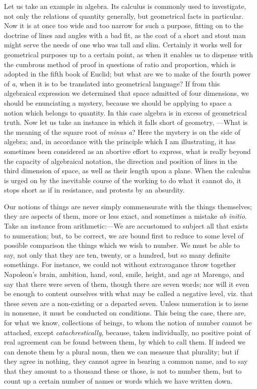 Let us take an example in algebra. Its calculus is commonly used to
investigate, not only the relations of quantity generally, but
geometrical facts in particular. Now it is at once too wide and too
narrow for such a purpose, fitting on to the doctrine of lines and
angles with a bad fit, as the coat of a short and stout man might
serve the needs of one who was tall and slim. Certainly it works well
for geometrical purposes up to a certain point, as when it enables us
to dispense with the cumbrous method of proof in questions of ratio
and proportion, which is adopted in the fifth book of Euclid; but what
are we to make of the fourth power of \emph{a}, when it is to be
translated into geometrical language? If from this algebraical
expression we determined that space admitted of four dimensions, we
should be enunciating a mystery, because we should be applying to
space a notion which belongs to quantity. In this case algebra is in
excess of geometrical truth. Now let us take an instance in which it
falls short of geometry, —What is the meaning of the square root
of \emph{minus a}? Here the mystery is on the side of algebra; and, in
accordance with the principle which I am illustrating, it has
sometimes been considered as an abortive effort to express, what is
really beyond the capacity of algebraical notation, the direction and
position of lines in the third dimension of space, as well as their
length upon a plane. When the calculus is urged on by the inevitable
course of the working to do what it cannot do, it stops short as if in
resistance, and protests by an absurdity.

Our notions of things are never simply commensurate with the things
themselves; they are aspects of them, more or less exact, and
sometimes a mistake \emph{ab initio}. Take an instance from
arithmetic:—We are accustomed to subject all that exists to
numeration; but, to be correct, we are bound first to reduce to some
level of possible comparison the things which we wish to number. We
must be able to say, not only that they are ten, twenty, or a hundred,
but so many definite somethings. For instance, we could not without
extravagance throw together Napoleon's brain, ambition, hand, soul,
smile, height, and age at Marengo, and say that there were seven of
them, though there are seven words; nor will it even be enough to
content ourselves with what may be called a negative level, viz. that
these seven are a non-existing or a departed seven. Unless numeration
is to issue in nonsense, it must be conducted on conditions. This
being the case, there are, for what we know, collections of beings, to
whom the notion of number cannot be attached, except \emph{catachrestically},
because, taken individually, no positive point of real agreement
can be found between them, by which to call them. If indeed we can
denote them by a plural noun, then we can measure that plurality; but
if they agree in nothing, they cannot agree in bearing a common name,
and to say that they amount to a thousand these or those, is not to
number them, but to count up a certain number of names or words which
we have written down.


